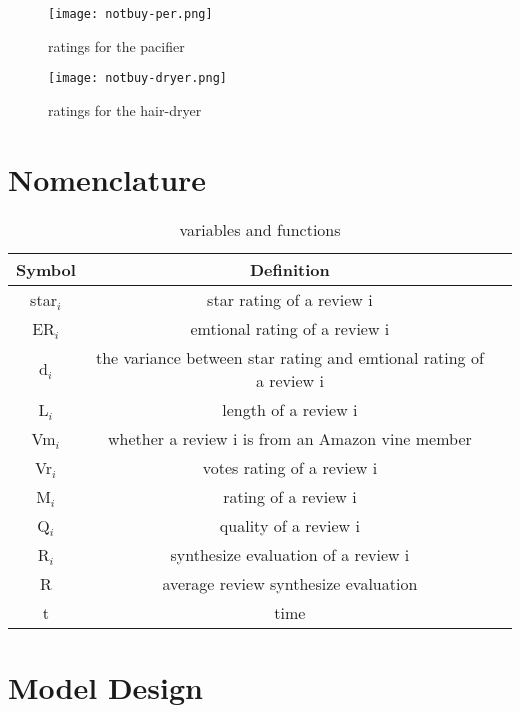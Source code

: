\documentclass{mcmthesis}
\begin{document}
\begin{figure}[h]
  \small
  \centering
  \texttt{[image: notbuy-per.png]}
  \caption{ratings for the pacifier}
\end{figure}

\begin{figure}[h]
  \small
  \centering
  \texttt{[image: notbuy-dryer.png]}
  \caption{ratings for the hair-dryer}
\end{figure}

\newpage
\section{Nomenclature}
\begin{table}[h]
  \centering
  \begin{tabular}{ccc}
    \hline
    Symbol & Definition\\
    \hline
    star$_{i}$ & star rating of a review i\\
    
    ER$_{i}$ & emtional rating of a review i\\
      
    d$_{i}$ & the variance between star rating and emtional rating of a review i\\

    L$_{i}$ & length of a review i\\

    Vm$_{i}$ & whether a review i is from an Amazon vine member\\
      
    Vr$_{i}$ & votes rating of a review i\\
      
    M$_{i}$ & rating of a review i\\

    Q$_{i}$ & quality of a review i\\
          
    R$_{i}$ & synthesize evaluation of a review i\\
    
    R & average review synthesize evaluation\\
      
    t & time\\
    \hline
  \end{tabular}
  \caption{variables and functions}
\end{table}

\section{Model Design}
\end{document}
